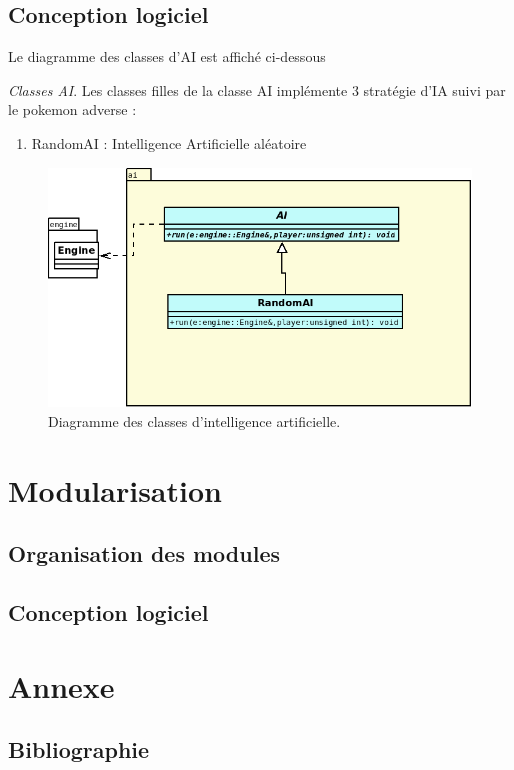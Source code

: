 \documentclass[a4paper,12pt]{article}
\begin{document}
    \clearpage
    \subsection{Conception logiciel}
    
    Le diagramme des classes d'AI est affiché ci-dessous
    
    \emph{Classes AI}. Les classes filles de la classe AI implémente 3 stratégie d'IA suivi par le pokemon adverse :\begin{enumerate}
        \item RandomAI : Intelligence Artificielle aléatoire
    \end{enumerate}


    \begin{landscape}
    \begin{figure}[p]
    \includegraphics[width=0.9\paperheight]{ai.png}
    \caption{\label{uml:ai}Diagramme des classes d'intelligence artificielle.}
    \end{figure}
    \end{landscape}


    \section{Modularisation}
    \label{sec:module}

    \subsection{Organisation des modules}

    \clearpage
    \subsection{Conception logiciel}
    
    \clearpage
    \section{Annexe}
    \label{sec:Annexe}
    \subsection{Bibliographie}

\end{document}
